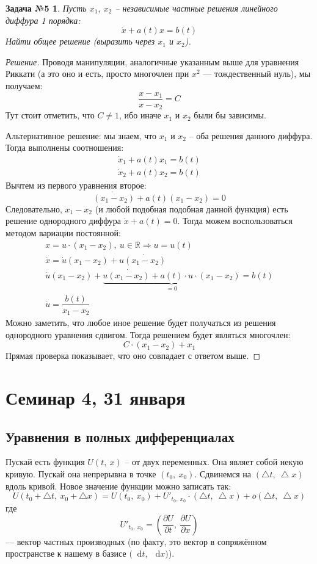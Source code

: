 \documentclass[a4paper,12pt]{article}
\newtheorem*{task5}{Задача №5}
\newcommand{\R}{\mathbb{R}}
\renewcommand*\d{\mathop{}\!\mathrm{d}}
\newcommand{\du}{\dot{u}}
\newcommand{\dx}{\dot{x}}
\begin{document}
\begin{task5}
Пусть $x_1,\ x_2$ -- независимые  частные решения линейного диффура 1 порядка:
\[\dx + a(t)x = b(t)\]
Найти общее решение (выразить через $x_1$ и $x_2$).
\end{task5}
\begin{proof}[Решение]
	Проводя манипуляции, аналогичные указанным выше для уравнения Риккати (а это оно и есть, просто многочлен при $x^2$ --- тождественный нуль), мы получаем:
	\[\dfrac{x - x_1}{x - x_2} = C\]
	Тут стоит отметить, что $C \neq 1$, ибо иначе $x_1$ и $x_2$ были бы зависимы. 
	
	Альтернативное решение: мы знаем, что $x_1$ и $x_2$ -- оба решения данного диффура. Тогда выполнены соотношения:
	\begin{gather*}
		\dx_1 + a(t)x_1 = b(t)\\
		\dx_2 + a(t)x_2 = b(t)
	\end{gather*}
	Вычтем из первого уравнения второе:
	\[\dot{(x_1 - x_2)} + a(t)(x_1 - x_2) = 0\]
	Следовательно, $x_1 - x_2$ (и любой подобная подобная данной функция) есть решение однородного диффура $\dx + a(t) = 0$. Тогда можем воспользоваться методом вариации постоянной:
	\begin{gather*}
		x = u \cdot (x_1 - x_2),\ u \in \R \Longrightarrow u = u(t) \\
		\dx = \du(x_1 - x_2) + u \dot{(x_1 - x_2)}\\
		\du(x_1 - x_2) + \underbrace{u \dot{(x_1 - x_2)} + a(t)\cdot u \cdot (x_1 - x_2)}_{= 0} = b(t)\\
		\du = \dfrac{b(t)}{x_1 - x_2}
	\end{gather*}
	Можно заметить, что любое иное решение будет получаться из решения однородного уравнения сдвигом. Тогда решением будет являться многочлен:
	\[C \cdot (x_1 - x_2) + x_1\]
	Прямая проверка показывает, что оно совпадает с ответом выше.
\end{proof}


\newpage
\section{Семинар 4, 31 января}

\subsection{Уравнения в полных дифференциалах}

Пускай есть функция $U(t,\ x)$ -- от двух переменных. Она являет собой некую кривую. Пускай она непрерывна в точке $(t_0,\ x_0)$. Сдвинемся на $(\bigtriangleup t,\ \bigtriangleup x)$ вдоль кривой. Новое значение функции можно записать так:
\[U(t_0 + \bigtriangleup t,\ x_0 + \bigtriangleup x) = U(t_0,\ x_0) + U'_{t_0,\ x_0} \cdot (\bigtriangleup t,\ \bigtriangleup x) + \overline{o}(\bigtriangleup t,\ \bigtriangleup x)\] где \[U'_{t_0,\ x_0} = \left(\dfrac{\partial U}{\partial t},\ \dfrac{\partial U}{\partial x}\right)\] --- вектор частных производных (по факту, это вектор в сопряжённом пространстве к нашему в базисе $\big(\d t,\ \d x\big)$).
\end{document}
